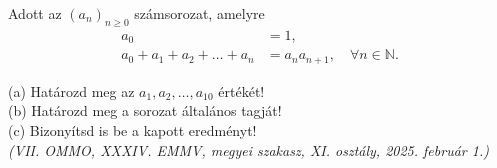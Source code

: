 \begin{problem}
Adott az $(a_{n})_{n\geq0}$ számsorozat, amelyre 
\begin{align*}
a_{0} & =1,\\
a_{0}+a_{1}+a_{2}+\dots+a_{n} & =a_{n}a_{n+1},\quad\forall n\in\mathbb{N}.
\end{align*}

(a) Határozd meg az $a_{1},a_{2},\dots,a_{10}$ értékét!\\
 (b) Határozd meg a sorozat általános tagját! \\
 (c) Bizonyítsd is be a kapott eredményt! \\
 \emph{(VII. OMMO, XXXIV. EMMV, megyei szakasz, XI. osztály, 2025. február 1.)}
 
\end{problem}

